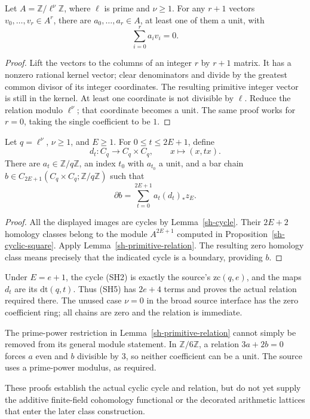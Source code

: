 \begin{lemma}\label{sh-primitive-relation}
Let \(A=\mathbb Z/\ell^\nu\mathbb Z\), where \(\ell\)
is prime and \(\nu\ge1\).
For any \(r+1\) vectors \(v_0,\ldots,v_r\in A^r\),
there are \(a_0,\ldots,a_r\in A\), at least one of
them a unit, with
\[
                         \sum_{i=0}^r a_iv_i=0.
\]
\end{lemma}
\begin{proof}
Lift the vectors to the columns of an integer
\(r\) by \(r+1\) matrix.
It has a nonzero rational kernel vector; clear
denominators and divide by the greatest common
divisor of its integer coordinates.
The resulting primitive integer vector is still
in the kernel.
At least one coordinate is not divisible by \(\ell\).
Reduce the relation modulo \(\ell^\nu\); that
coordinate becomes a unit.
The same proof works for \(r=0\), taking the
single coefficient to be \(1\).
\end{proof}

\begin{corollary}\label{sh-diagonal-relation}
Let \(q=\ell^\nu\), \(\nu\ge1\), and \(E\ge1\).
For \(0\le t\le2E+1\), define
\[
       d_t:C_q\longrightarrow C_q\times C_q,
                   \qquad x\longmapsto(x,tx).
\]
There are \(a_t\in\mathbb Z/q\mathbb Z\), an index
\(t_0\) with \(a_{t_0}\) a unit, and a bar chain
\(b\in C_{2E+1}(C_q\times C_q;\mathbb Z/q\mathbb Z)\)
such that
\[
                   \partial b
                      =\sum_{t=0}^{2E+1}a_t(d_t)_*z_E.
 \tag{SH5}
\]
\end{corollary}
\begin{proof}
All the displayed images are cycles by
Lemma~\ref{sh-cycle}.
Their \(2E+2\) homology classes belong to the module
\(A^{2E+1}\) computed in Proposition~\ref{sh-cyclic-square}.
Apply Lemma~\ref{sh-primitive-relation}.
The resulting zero homology class means precisely
that the indicated cycle is a boundary, providing \(b\).
\end{proof}

Under \(E=e+1\), the cycle (SH2) is exactly the
source's \(\mathrm{zc}(q,e)\), and the maps \(d_t\)
are its \(\mathrm{dt}(q,t)\).
Thus (SH5) has \(2e+4\) terms and proves the
actual relation required there.
The unused case \(\nu=0\) in the broad source
interface has the zero coefficient ring; all chains
are zero and the relation is immediate.

The prime-power restriction in
Lemma~\ref{sh-primitive-relation} cannot simply be
removed from its general module statement.
In \(\mathbb Z/6\mathbb Z\), a relation
\(3a+2b=0\) forces \(a\) even and \(b\) divisible
by \(3\), so neither coefficient can be a unit.
The source uses a prime-power modulus, as required.

These proofs establish the actual cyclic cycle and
relation, but do not yet supply the additive
finite-field cohomology functional or the decorated
arithmetic lattices that enter the later class
construction.


